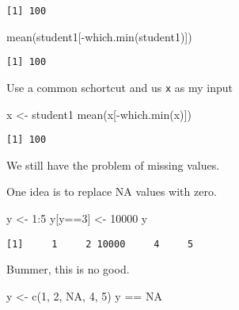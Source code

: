\documentclass[
  letterpaper,
  DIV=11,
  numbers=noendperiod]{scrartcl}
\newenvironment{Shaded}{\begin{snugshade}}{\end{snugshade}}
\newcommand{\ConstantTok}[1]{\textcolor[rgb]{0.56,0.35,0.01}{#1}}
\newcommand{\DecValTok}[1]{\textcolor[rgb]{0.68,0.00,0.00}{#1}}
\newcommand{\FunctionTok}[1]{\textcolor[rgb]{0.28,0.35,0.67}{#1}}
\newcommand{\NormalTok}[1]{\textcolor[rgb]{0.00,0.23,0.31}{#1}}
\newcommand{\OtherTok}[1]{\textcolor[rgb]{0.00,0.23,0.31}{#1}}
\newcommand{\SpecialCharTok}[1]{\textcolor[rgb]{0.37,0.37,0.37}{#1}}
\begin{document}
\begin{verbatim}
[1] 100
\end{verbatim}

\begin{Shaded}
\begin{Highlighting}[]
\FunctionTok{mean}\NormalTok{(student1[}\SpecialCharTok{{-}}\FunctionTok{which.min}\NormalTok{(student1)])}
\end{Highlighting}
\end{Shaded}

\begin{verbatim}
[1] 100
\end{verbatim}

Use a common schortcut and us \texttt{x} as my input

\begin{Shaded}
\begin{Highlighting}[]
\NormalTok{x }\OtherTok{\textless{}{-}}\NormalTok{ student1}
\FunctionTok{mean}\NormalTok{(x[}\SpecialCharTok{{-}}\FunctionTok{which.min}\NormalTok{(x)])}
\end{Highlighting}
\end{Shaded}

\begin{verbatim}
[1] 100
\end{verbatim}

We still have the problem of missing values.

One idea is to replace NA values with zero.

\begin{Shaded}
\begin{Highlighting}[]
\NormalTok{y }\OtherTok{\textless{}{-}} \DecValTok{1}\SpecialCharTok{:}\DecValTok{5}
\NormalTok{y[y}\SpecialCharTok{==}\DecValTok{3}\NormalTok{] }\OtherTok{\textless{}{-}} \DecValTok{10000}
\NormalTok{y}
\end{Highlighting}
\end{Shaded}

\begin{verbatim}
[1]     1     2 10000     4     5
\end{verbatim}

Bummer, this is no good.

\begin{Shaded}
\begin{Highlighting}[]
\NormalTok{y }\OtherTok{\textless{}{-}} \FunctionTok{c}\NormalTok{(}\DecValTok{1}\NormalTok{, }\DecValTok{2}\NormalTok{, }\ConstantTok{NA}\NormalTok{, }\DecValTok{4}\NormalTok{, }\DecValTok{5}\NormalTok{)}
\NormalTok{y }\SpecialCharTok{==} \ConstantTok{NA}
\end{Highlighting}
\end{Shaded}
\end{document}
